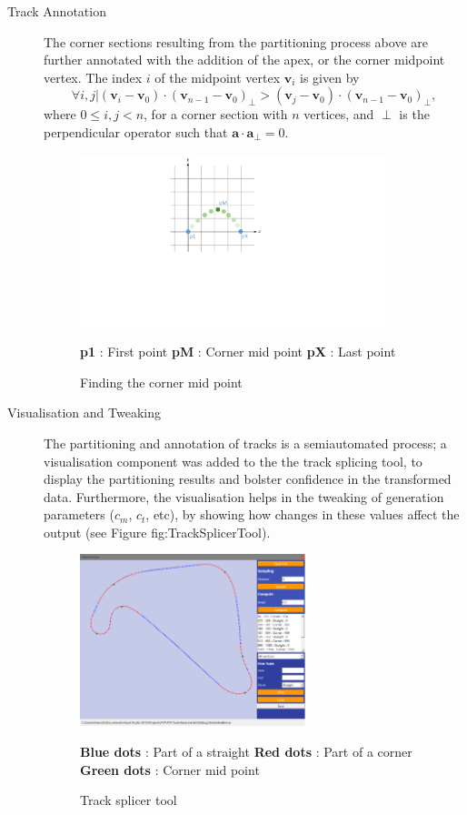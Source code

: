 \begin{description}
	\item [Track Annotation] The corner sections resulting from the partitioning process above are further annotated with the addition of the apex, or the corner midpoint vertex. The index $i$ of the midpoint vertex $\mathbf{v}_i$ is given by
	\begin{equation}
		\forall i,j | (\mathbf{v}_i - \mathbf{v}_0) \cdot (\mathbf{v}_{n-1} - \mathbf{v}_0)_{\perp} > (\mathbf{v}_j - \mathbf{v}_0) \cdot (\mathbf{v}_{n-1} - \mathbf{v}_0)_{\perp},  
	\end{equation} 
	where $0 \leq i,j < n$, for a corner section with $n$ vertices, and $\perp$ is the perpendicular operator such that $\mathbf{a} \cdot \mathbf{a}_{\perp} = 0$. 
	
	\begin{figure}[!htb]
		\centering
		\includegraphics[height=5cm]{diagrams/cornerMidPoint.pdf}
		\caption[Corner mid point]{Finding the corner mid point}
		\textbf{p1} : First point \textbf{pM} : Corner mid point \textbf{pX} : Last point
		\label{fig:diagram-cornerMidPoint}
	\end{figure}
	
	\item [Visualisation and Tweaking] The partitioning and annotation of tracks is a semiautomated process; a visualisation component was added to the the track splicing tool, to display the partitioning results and bolster confidence in the transformed data. Furthermore, the visualisation helps in the tweaking of generation parameters ($c_m$, $c_t$, etc), by showing how changes in these values affect the output (see Figure fig:TrackSplicerTool). 
	
	\begin{figure}[!htb]
		\centering
		\includegraphics[height=5cm]{images/tracksplicertool}
		\caption{Track splicer tool}
		\textbf{Blue dots} : Part of a straight \textbf{Red dots} : Part of a corner \textbf{Green dots} : Corner mid point
		\label{fig:TrackSplicerTool}
	\end{figure}	
\end{description}

